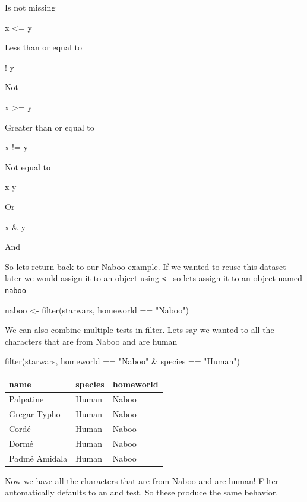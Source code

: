 \documentclass[
  letterpaper,
  DIV=11,
  numbers=noendperiod,
  oneside]{scrreprt}
\newenvironment{Shaded}{\begin{snugshade}}{\end{snugshade}}
\newcommand{\FunctionTok}[1]{\textcolor[rgb]{0.28,0.35,0.67}{#1}}
\newcommand{\NormalTok}[1]{\textcolor[rgb]{0.00,0.23,0.31}{#1}}
\newcommand{\OtherTok}[1]{\textcolor[rgb]{0.00,0.23,0.31}{#1}}
\newcommand{\SpecialCharTok}[1]{\textcolor[rgb]{0.37,0.37,0.37}{#1}}
\newcommand{\StringTok}[1]{\textcolor[rgb]{0.13,0.47,0.30}{#1}}
\begin{document}
Is not missing

x \textless= y

Less than or equal to

! y

Not

x \textgreater= y

Greater than or equal to

x != y

Not equal to

x \textbar{} y

Or

x \& y

And

So lets return back to our Naboo example. If we wanted to reuse this
dataset later we would assign it to an object using
\texttt{\textless{}-} so lets assign it to an object named
\texttt{naboo}

\begin{Shaded}
\begin{Highlighting}[]
\NormalTok{naboo }\OtherTok{\textless{}{-}} \FunctionTok{filter}\NormalTok{(starwars, homeworld }\SpecialCharTok{==} \StringTok{"Naboo"}\NormalTok{) }
\end{Highlighting}
\end{Shaded}

We can also combine multiple tests in filter. Lets say we wanted to all
the characters that are from Naboo and are human

\begin{Shaded}
\begin{Highlighting}[]
 \FunctionTok{filter}\NormalTok{(starwars, homeworld }\SpecialCharTok{==} \StringTok{"Naboo"} \SpecialCharTok{\&}\NormalTok{ species }\SpecialCharTok{==} \StringTok{"Human"}\NormalTok{)}
\end{Highlighting}
\end{Shaded}

\begin{tabular}{l|l|l}
\hline
name & species & homeworld\\
\hline
Palpatine & Human & Naboo\\
\hline
Gregar Typho & Human & Naboo\\
\hline
Cordé & Human & Naboo\\
\hline
Dormé & Human & Naboo\\
\hline
Padmé Amidala & Human & Naboo\\
\hline
\end{tabular}

Now we have all the characters that are from Naboo and are human! Filter
automatically defaults to an and test. So these produce the same
behavior.
\end{document}
